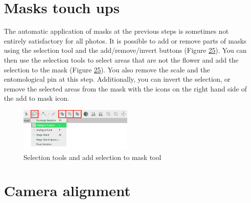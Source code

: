 \documentclass[
]{book}
\begin{document}
\hypertarget{masks-touch-ups}{%
\section{Masks touch ups}\label{masks-touch-ups}}

The automatic application of masks at the previous steps is sometimes
not entirely satisfactory for all photos. It is possible to add or
remove parts of masks using the selection tool and the add/remove/invert
buttons (Figure \protect\hyperlink{tools_masks}{25}). You can then use the selection tools to
select areas that are not the flower and add the selection to the mask
(Figure \protect\hyperlink{tools_masks}{25}). You also remove the scale and the
entomological pin at this step. Additionally, you can invert the
selection, or remove the selected areas from the mask with the icons on
the right hand side of the add to mask icon.

\begin{figure}
\hypertarget{tools_masks}{%
\centering
\includegraphics[width=0.5\textwidth,height=\textheight]{Figures/tools_masks.png}
\caption{Selection tools and add selection to mask
tool}\label{tools_masks}
}
\end{figure}

\hypertarget{camera-alignment}{%
\section{Camera alignment}\label{camera-alignment}}
\end{document}
